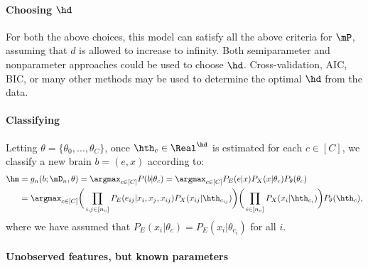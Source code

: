 \paragraph{Choosing $\hd$}

For both the above choices, this model can satisfy all the above criteria for $\mP$, assuming that $d$ is allowed to increase to infinity.  Both semiparameter and nonparameter approaches could be used to choose $\hd$.  Cross-validation, AIC, BIC, or many other methods may be used to determine the optimal $\hd$ from the data. 


\paragraph{Classifying}

Letting $\theta=\{\theta_0,\ldots,\theta_C\}$, once $\hth_c \in \Real^{\hd}$ is estimated for each $c\in[C]$, we classify a new brain $b=(e,x)$ according to:
\begin{align}
	 \hm &= g_n(b; \mD_n, \theta) = \argmax_{c\in[C]} P(b | \theta_c) 
	 	 = \argmax_{c\in[C]}  P_E(e | x)  P_X(x | \theta_c) P_{\theta}(\theta_c) \nonumber \\
		&= \argmax_{c\in[C]}  \bigg(\prod_{i,j \in [n_v]} P_E(e_{ij} | x_i, x_j, x_{ij}) P_X(x_{ij} | \hth_{c_{ij}})\bigg) \bigg(\prod_{i \in [n_v]} P_X(x_i | \hth_{c_i})\bigg)  P_{\theta}(\hth_c)
		,
\end{align}
where we have assumed that $P_E(x_i | \theta_c)=P_E(x_i | \theta_{c_i})$ for all $i$.


\paragraph{Unobserved features, but known parameters}

